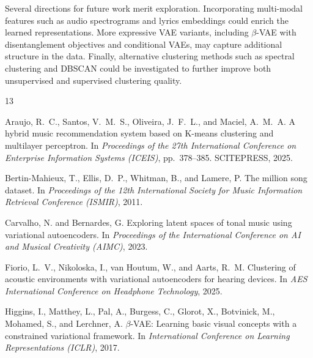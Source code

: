 \documentclass[11pt]{article}
\begin{document}
Several directions for future work merit exploration. Incorporating multi-modal features such as audio spectrograms and lyrics embeddings could enrich the learned representations. More expressive VAE variants, including $\beta$-VAE with disentanglement objectives and conditional VAEs, may capture additional structure in the data. Finally, alternative clustering methods such as spectral clustering and DBSCAN could be investigated to further improve both unsupervised and supervised clustering quality.



\begin{thebibliography}{13}

Araujo, R.~C., Santos, V.~M.~S., Oliveira, J.~F.~L., and Maciel, A.~M.~A.
\newblock A hybrid music recommendation system based on {K}-means clustering and multilayer perceptron.
\newblock In \emph{Proceedings of the 27th International Conference on Enterprise Information Systems (ICEIS)}, pp.~378--385. SCITEPRESS, 2025.

Bertin-Mahieux, T., Ellis, D.~P., Whitman, B., and Lamere, P.
\newblock The million song dataset.
\newblock In \emph{Proceedings of the 12th International Society for Music Information Retrieval Conference (ISMIR)}, 2011.

Carvalho, N. and Bernardes, G.
\newblock Exploring latent spaces of tonal music using variational autoencoders.
\newblock In \emph{Proceedings of the International Conference on AI and Musical Creativity (AIMC)}, 2023.

Fiorio, L.~V., Nikoloska, I., van Houtum, W., and Aarts, R.~M.
\newblock Clustering of acoustic environments with variational autoencoders for hearing devices.
\newblock In \emph{AES International Conference on Headphone Technology}, 2025.

Higgins, I., Matthey, L., Pal, A., Burgess, C., Glorot, X., Botvinick, M., Mohamed, S., and Lerchner, A.
\newblock $\beta$-{VAE}: Learning basic visual concepts with a constrained variational framework.
\newblock In \emph{International Conference on Learning Representations (ICLR)}, 2017.


\end{thebibliography}
\end{document}
